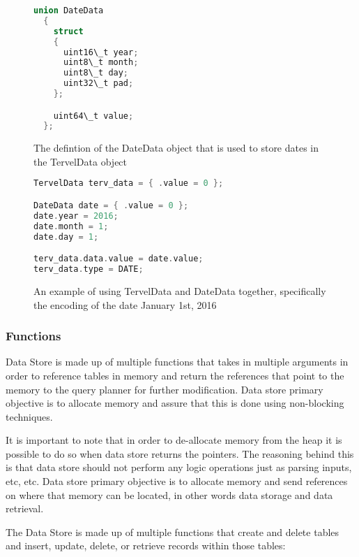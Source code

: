 \documentclass[letterpaper, 11pt]{article}
\begin{document}
\begin{figure}
  \begin{lstlisting}[language=C++]
  union DateData
  {
    struct
    {
      uint16\_t year;
      uint8\_t month;
      uint8\_t day;
      uint32\_t pad;
    };

    uint64\_t value;
  };
  \end{lstlisting}

  \caption{The defintion of the DateData object that is used to store dates in the TervelData object}
  \label{code:tervel_data_date_def}
\end{figure}

\begin{figure}
\begin{lstlisting}[language=C++]
TervelData terv_data = { .value = 0 };

DateData date = { .value = 0 };
date.year = 2016;
date.month = 1;
date.day = 1;

terv_data.data.value = date.value;
terv_data.type = DATE;
\end{lstlisting}
\caption{An example of using TervelData and DateData together, specifically the encoding of 
the date January 1st, 2016}
\label{code:tervel_data_example}
\end{figure}

\newpage
\subsubsection{Functions}
Data Store is made up of multiple functions that takes in multiple arguments in order to reference tables in memory and return the references that point to the memory to the query planner for further modification. Data store primary objective is to allocate memory and assure that this is done using non-blocking techniques. 
\par\vspace{\baselineskip}

It is important to note that in order to de-allocate memory from the heap it is possible to do so when data store returns the pointers. The reasoning behind this is that data store should not perform any logic operations just as parsing inputs, etc, etc. Data store primary objective is to allocate memory and send references on where that memory can be located, in other words data storage and data retrieval. 
\par\vspace{\baselineskip}
The Data Store is made up of multiple functions that create and delete tables and insert, update, delete, or retrieve records within those tables:
\end{document}
